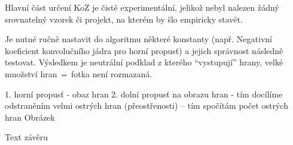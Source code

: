 Hlavní část určení KoZ je čistě experimentální, jelikož nebyl nalezen žádný srovnatelný vzorek či projekt, na kterém by šlo empiricky stavět.

Je nutné ručně nastavit do algoritmu některé konstanty (např. Negativní koeficient konvolučního jádra pro horní propusť) a jejich správnost následně testovat. Výsledkem je neutrální podklad z kterého “vystupují” hrany, velké množství hran ⇔ fotka není rozmazaná.


1. horní propusť - obaz hran
2. dolní propusť na obrazu hran - tím docílíme odstraněním velmi ostrých hran (přeostřenosti)
-- tím spočítám počet ostrých hran
Obrázek 





%


%


Text závěru


